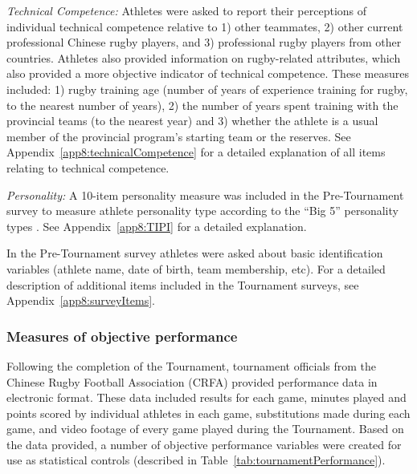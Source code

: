 \begin{CJK}{UTF8}{gbsn}
\textit{Technical Competence:} Athletes were asked to report their perceptions of individual technical competence relative to 1) other teammates, 2) other current professional Chinese rugby players, and  3) professional rugby players from other countries.  Athletes also provided information on rugby-related attributes, which also provided a more objective indicator of technical competence.  These measures included: 1) rugby training age (number of years of experience training for rugby, to the nearest number of years), 2) the number of years spent training with the provincial teams (to the nearest year) and 3) whether the athlete is a usual member of the provincial program's starting team or the reserves.  See Appendix~\ref{app8:technicalCompetence} for a detailed explanation of all items relating to technical competence.

\textit{Personality:} A 10-item personality measure was included in the Pre-Tournament survey to measure athlete personality type according to the ``Big 5'' personality types \citep[Ten Item Personality Index - TIPI.  The 5 types are: Extraversion, Agreeableness, Conscientiousness, Emotional Stability (Neuroticism reverse coded), and Openness to Experiences; see][]{Gosling2003}. See Appendix~\ref{app8:TIPI} for a detailed explanation.

In the Pre-Tournament survey athletes were asked about basic identification variables (athlete name, date of birth, team membership, etc).  For a detailed description of additional items included in the Tournament surveys, see Appendix~\ref{app8:surveyItems}.



\subsubsection{Measures of objective performance\label{app8:objectivePerformance}}
Following the completion of the Tournament, tournament officials from the Chinese Rugby Football Association (CRFA) provided performance data in electronic format. These data included results for each game, minutes played and points scored by individual athletes in each game, substitutions made during each game, and video footage of every game played during the Tournament.  Based on the data provided, a number of objective performance variables were created for use as statistical controls (described in Table~\ref{tab:tournamentPerformance}).




\end{CJK}
